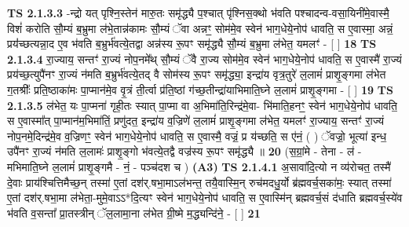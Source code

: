 \documentclass[17pt]{extarticle}
\begin{document}
                  \newline
                                \textbf{ TS 2.1.3.3} \newline
                  -न्द्रो यत् पृश्नि॒स्तेन॑ मारु॒तः समृ॑द्ध्यै प॒श्चात् पृ॑श्निस॒क्थो भ॑वति पश्चादन्व-वसा॒यिनी॑मे॒वास्मै॒ विशं॑ करोति सौ॒म्यं ब॒भ्रुमा ल॑भे॒तान्न॑कामः सौ॒म्यं ॅवा अन्नꣳ॒॒ सोम॑मे॒व स्वेन॑ भाग॒धेये॒नोप॑ धावति॒ स ए॒वास्मा॒ अन्नं॒ प्रय॑॑च्छत्यन्ना॒द ए॒व भ॑वति ब॒भ्रुर्भ॑वत्ये॒तद्वा अन्न॑स्य रू॒पꣳ समृ॑द्ध्यै सौ॒म्यं ब॒भ्रुमा ल॑भेत॒ यमलꣳ॑ - [  ] \textbf{  18} \newline
                  \newline
                                \textbf{ TS 2.1.3.4} \newline
                  रा॒ज्याय॒ सन्तꣳ॑ रा॒ज्यं नोप॒नमे᳚थ् सौ॒म्यं ॅवै रा॒ज्य सोम॑मे॒व स्वेन॑ भाग॒धेये॒नोप॑ धावति॒ स ए॒वास्मै॑ रा॒ज्यं प्रय॑च्छ॒त्युपै॑नꣳ रा॒ज्यं न॑मति ब॒भ्रुर्भ॑वत्ये॒तद् वै सोम॑स्य रू॒पꣳ समृ॑द्ध्या॒ इन्द्रा॑य वृत्र॒तुरे॑ ल॒लामं॑ प्राशृ॒ङ्गमा ल॑भेत ग॒तश्रीः᳚ प्रति॒ष्ठाका॑मः पा॒प्मान॑मे॒व वृ॒त्रं ती॒र्त्वा प्र॑ति॒ष्ठां ग॑च्छ॒तीन्द्रा॑याभिमाति॒घ्ने ल॒लामं॑ प्राशृ॒ङ्गमा - [  ] \textbf{  19} \newline
                  \newline
                                \textbf{ TS 2.1.3.5} \newline
                  ल॑भेत॒ यः पा॒प्मना॑ गृही॒तः स्यात् पा॒प्मा वा अ॒भिमा॑ति॒रिन्द्र॑मे॒वा- भि॑माति॒हनꣳ॒॒ स्वेन॑ भाग॒धेये॒नोप॑ धावति॒ स ए॒वास्मा᳚त् पा॒प्मान॑म॒भिमा॑तिं॒ प्रणु॑दत॒ इन्द्रा॑य व॒ज्रिणे॑ ल॒लामं॑ प्राशृ॒ङ्गमा ल॑भेत॒ यमलꣳ॑ रा॒ज्याय॒ सन्तꣳ॑ रा॒ज्यं नोप॒नमे॒दिन्द्र॑मे॒व व॒ज्रिणꣳ॒॒ स्वेन॑ भाग॒धेये॒नोप॑ धावति॒ स ए॒वास्मै॒ वज्रं॒ प्र य॑च्छति॒ स ए॑नं॒ ( ) ॅवज्रो॒ भूत्या॑ इन्ध॒ उपै॑नꣳ रा॒ज्यं न॑मति ल॒लामः॑ प्राशृ॒ङ्गो भ॑वत्ये॒तद्वै वज्र॑स्य रू॒पꣳ समृ॑द्ध्यै ॥ \textbf{  20 } \newline
                  \newline
                      (स॒ग्रां॒मे - तेना - ल॑ - मभिमाति॒घ्ने ल॒लामं॑ प्राशृ॒ङ्गमै - नं॒ - पञ्च॑दश च )  \textbf{(A3)} \newline \newline
                                        \textbf{ TS 2.1.4.1} \newline
                  अ॒सावा॑दि॒त्यो न व्य॑रोचत॒ तस्मै॑ दे॒वाः प्राय॑श्चित्तिमैच्छ॒न् तस्मा॑ ए॒तां दश॑र्.षभा॒माऽल॑भन्त॒ तयै॒वास्मि॒न् रुच॑मदधु॒र्यो ब्र॑ह्मवर्च॒सका॑मः॒ स्यात् तस्मा॑ ए॒तां दश॑र्.षभा॒मा ल॑भेता॒-मुमे॒वाऽऽ*दि॒त्यꣳ स्वेन॑ भाग॒धेये॒नोप॑ धावति॒ स ए॒वास्मि॑न् ब्रह्मवर्च॒सं द॑धाति ब्रह्मवर्च॒स्ये॑व भ॑वति व॒सन्ता᳚ प्रा॒तस्त्रीन् ॅल॒लामा॒ना ल॑भेत ग्री॒ष्मे म॒द्ध्यन्दि॑ने॒ - [  ] \textbf{  21} \newline
\end{document}
